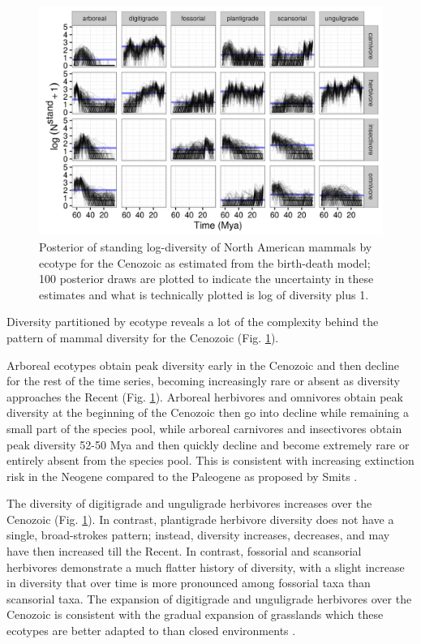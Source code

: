 \afterpage{\clearpage}
\begin{figure}[p]
  \centering
  \includegraphics[width=\textwidth,height=\textheight,keepaspectratio=true]{chapter_coping/figure/ecotype_diversity}
  \caption[Estimated mammal ecotype log-diversity for the Cenozoic]{Posterior of standing log-diversity of North American mammals by ecotype for the Cenozoic as estimated from the birth-death model; 100 posterior draws are plotted to indicate the uncertainty in these estimates and what is technically plotted is log of diversity plus 1.}
  \label{fig:ecotype_diversity}
\end{figure}

Diversity partitioned by ecotype reveals a lot of the complexity behind the pattern of mammal diversity for the Cenozoic (Fig. \ref{fig:ecotype_diversity}). 

Arboreal ecotypes obtain peak diversity early in the Cenozoic and then decline for the rest of the time series, becoming increasingly rare or absent as diversity approaches the Recent (Fig. \ref{fig:ecotype_diversity}). Arboreal herbivores and omnivores obtain peak diversity at the beginning of the Cenozoic then go into decline while remaining a small part of the species pool, while arboreal carnivores and insectivores obtain peak diversity 52-50 Mya and then quickly decline and become extremely rare or entirely absent from the species pool. This is consistent with increasing extinction risk in the Neogene compared to the Paleogene as proposed by Smits \citep{Smits2015b}.

The diversity of digitigrade and unguligrade herbivores increases over the Cenozoic (Fig. \ref{fig:ecotype_diversity}). In contrast, plantigrade herbivore diversity does not have a single, broad-strokes pattern; instead, diversity increases, decreases, and may have then increased till the Recent. In contrast, fossorial and scansorial herbivores demonstrate a much flatter history of diversity, with a slight increase in diversity that over time is more pronounced among fossorial taxa than scansorial taxa. The expansion of digitigrade and unguligrade herbivores over the Cenozoic is consistent with the gradual expansion of grasslands which these ecotypes are better adapted to than closed environments \citep{Blois2009,Stromberg2005}.

